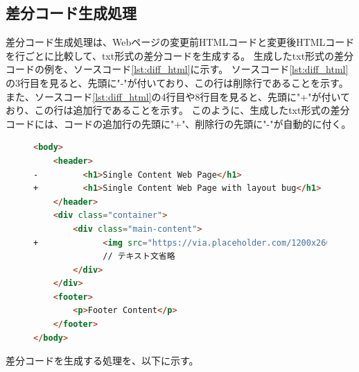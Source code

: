 \subsection{差分コード生成処理}\label{subsec:diff_file_generate}
差分コード生成処理は、Webページの変更前HTMLコードと変更後HTMLコードを行ごとに比較して、txt形式の差分コードを生成する。
生成したtxt形式の差分コードの例を、ソースコード\ref{lst:diff_html}に示す。
ソースコード\ref{lst:diff_html}の3行目を見ると、先頭に"-"が付いており、この行は削除行であることを示す。
また、ソースコード\ref{lst:diff_html}の4行目や8行目を見ると、先頭に"+"が付いており、この行は追加行であることを示す。
このように、生成したtxt形式の差分コードには、コードの追加行の先頭に"+"、削除行の先頭に"-"が自動的に付く。
\begin{figure}[tp]
    \begin{lstlisting}[language=HTML, caption=生成したtxt形式の差分コードの例, label=lst:diff_html]
<body>
    <header>
-         <h1>Single Content Web Page</h1>
+         <h1>Single Content Web Page with layout bug</h1>
    </header>
    <div class="container">
        <div class="main-content">
+             <img src="https://via.placeholder.com/1200x260" alt="Placeholder Image">
              // テキスト文省略
        </div>
    </div>
    <footer>
        <p>Footer Content</p>
    </footer>
</body>
    \end{lstlisting}
\end{figure}
\par
差分コードを生成する処理を、以下に示す。
